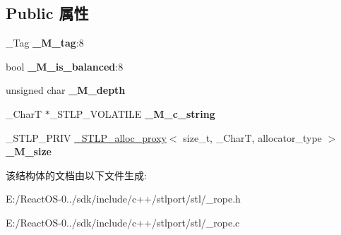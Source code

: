 \subsection*{Public 属性}
\begin{DoxyCompactItemize}
\item 
\mbox{\label{struct___rope___rope_rep_a3c7d25e4172e8b2c50fcf0878956ec5b}} 
\+\_\+\+Tag {\bfseries \+\_\+\+M\+\_\+tag}\+:8
\item 
\mbox{\label{struct___rope___rope_rep_ab982b69e52634c451b8ed21464321130}} 
bool {\bfseries \+\_\+\+M\+\_\+is\+\_\+balanced}\+:8
\item 
\mbox{\label{struct___rope___rope_rep_aa946810e2ea93fc03306a14b6a074b59}} 
unsigned char {\bfseries \+\_\+\+M\+\_\+depth}
\item 
\mbox{\label{struct___rope___rope_rep_a34ab5fa6fc522c359b9fcc80e4a10d4a}} 
\+\_\+\+CharT $\ast$\+\_\+\+S\+T\+L\+P\+\_\+\+V\+O\+L\+A\+T\+I\+LE {\bfseries \+\_\+\+M\+\_\+c\+\_\+string}
\item 
\mbox{\label{struct___rope___rope_rep_ad026203a2e2864f3387e8b63bef6bac3}} 
\+\_\+\+S\+T\+L\+P\+\_\+\+P\+R\+IV \hyperlink{class___s_t_l_p__alloc__proxy}{\+\_\+\+S\+T\+L\+P\+\_\+alloc\+\_\+proxy}$<$ size\+\_\+t, \+\_\+\+CharT, allocator\+\_\+type $>$ {\bfseries \+\_\+\+M\+\_\+size}
\end{DoxyCompactItemize}


该结构体的文档由以下文件生成\+:\begin{DoxyCompactItemize}
\item 
E\+:/\+React\+O\+S-\/0../sdk/include/c++/stlport/stl/\+\_\+rope.\+h\item 
E\+:/\+React\+O\+S-\/0../sdk/include/c++/stlport/stl/\+\_\+rope.\+c\end{DoxyCompactItemize}
